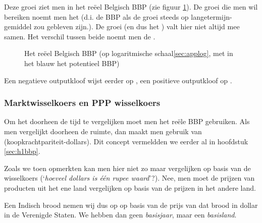 Deze groei ziet men in het re\"eel Belgisch BBP (zie figuur \ref{fig:h5rebel}). De groei die men wil bereiken noemt men het  (d.i. de BBP als de groei steeds op langetermijn-gemiddel zou gebleven zijn.). De groei (en dus het ) valt hier niet altijd mee samen. Het verschil tussen beide noemt men de .

\begin{figure}[H]
\small\centering\captionsetup{justification=centering,margin=2cm}
\caption{Het re\"eel Belgisch BBP (op logaritmische schaal\ref{sec:applog}, met in het blauw het potentieel BBP)}
\label{fig:h5rebel}
\end{figure}

\noindent Een negatieve outputkloof wijst eerder op , een positieve outputkloof op .

\subsubsection{Marktwisselkoers en PPP wisselkoers}

Om het  doorheen de tijd te vergelijken moet men het re\"ele BBP gebruiken. Als men vergelijkt doorheen de ruimte, dan maakt men gebruik van  (koopkrachtpariteit-dollars). Dit concept vermeldden we eerder al in hoofdstuk \ref{sec:h1bbp}.
\par Zoals we toen opmerkten kan men hier niet zo maar vergelijken op basis van de wisselkoers (`\textit{hoeveel dollars is \'e\'en rupee waard}'?). Nee, men moet de prijzen van producten uit het ene land vergelijken op basis van de prijzen in het andere land.
\par Een Indisch brood nemen wij dus op op basis van de prijs van dat brood in dollar in de Verenigde Staten. We hebben dan geen \textit{basisjaar}, maar een \textit{basisland}.\\

